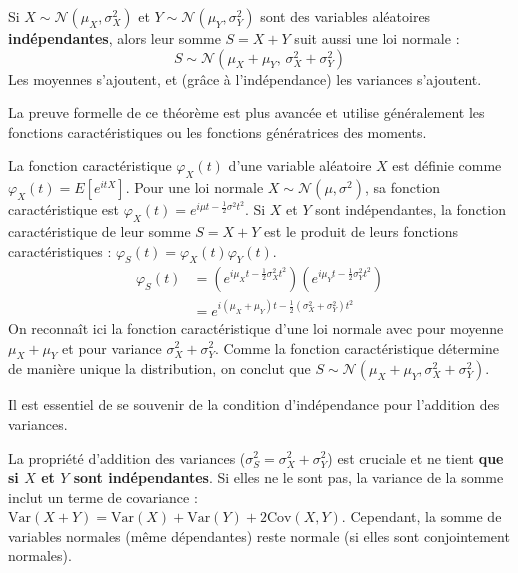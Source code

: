 \begin{theorembox}
Si $X \sim \mathcal{N}(\mu_X, \sigma_X^2)$ et $Y \sim \mathcal{N}(\mu_Y, \sigma_Y^2)$ sont des variables aléatoires \textbf{indépendantes}, alors leur somme $S = X + Y$ suit aussi une loi normale :
$$ S \sim \mathcal{N}(\mu_X + \mu_Y, \, \sigma_X^2 + \sigma_Y^2) $$
Les moyennes s'ajoutent, et (grâce à l'indépendance) les variances s'ajoutent.
\end{theorembox}

La preuve formelle de ce théorème est plus avancée et utilise généralement les fonctions caractéristiques ou les fonctions génératrices des moments.

\begin{proofbox}
La fonction caractéristique $\varphi_X(t)$ d'une variable aléatoire $X$ est définie comme $\varphi_X(t) = E[e^{itX}]$.
Pour une loi normale $X \sim \mathcal{N}(\mu, \sigma^2)$, sa fonction caractéristique est $\varphi_X(t) = e^{i\mu t - \frac{1}{2}\sigma^2 t^2}$.
Si $X$ et $Y$ sont indépendantes, la fonction caractéristique de leur somme $S=X+Y$ est le produit de leurs fonctions caractéristiques : $\varphi_S(t) = \varphi_X(t) \varphi_Y(t)$.
\begin{align*}
\varphi_S(t) &= \left( e^{i\mu_X t - \frac{1}{2}\sigma_X^2 t^2} \right) \left( e^{i\mu_Y t - \frac{1}{2}\sigma_Y^2 t^2} \right) \\
&= e^{i(\mu_X + \mu_Y)t - \frac{1}{2}(\sigma_X^2 + \sigma_Y^2)t^2}
\end{align*}
On reconnaît ici la fonction caractéristique d'une loi normale avec pour moyenne $\mu_X + \mu_Y$ et pour variance $\sigma_X^2 + \sigma_Y^2$. Comme la fonction caractéristique détermine de manière unique la distribution, on conclut que $S \sim \mathcal{N}(\mu_X + \mu_Y, \sigma_X^2 + \sigma_Y^2)$.
\end{proofbox}

Il est essentiel de se souvenir de la condition d'indépendance pour l'addition des variances.

\begin{remarquebox}
La propriété d'addition des variances ($\sigma_S^2 = \sigma_X^2 + \sigma_Y^2$) est cruciale et ne tient \textbf{que si $X$ et $Y$ sont indépendantes}. Si elles ne le sont pas, la variance de la somme inclut un terme de covariance : $\text{Var}(X+Y) = \text{Var}(X) + \text{Var}(Y) + 2\text{Cov}(X, Y)$. Cependant, la somme de variables normales (même dépendantes) reste normale (si elles sont conjointement normales).
\end{remarquebox}

